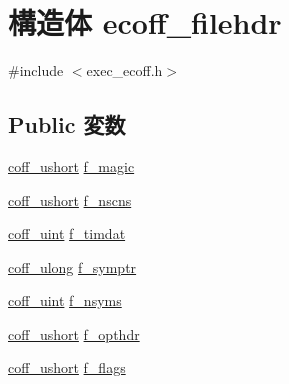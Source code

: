 \hypertarget{structecoff__filehdr}{
\section{構造体 ecoff\_\-filehdr}
\label{structecoff__filehdr}
}


{\ttfamily \#include $<$exec\_\-ecoff.h$>$}\subsection*{Public 変数}
\begin{DoxyCompactItemize}
\item 
\hyperlink{ecoff__machdep_8h_a650e29ece54d87a3fb9db4505a0efb68}{coff\_\-ushort} \hyperlink{structecoff__filehdr_a1be82655fe99764c18d82ed35059ddd4}{f\_\-magic}
\item 
\hyperlink{ecoff__machdep_8h_a650e29ece54d87a3fb9db4505a0efb68}{coff\_\-ushort} \hyperlink{structecoff__filehdr_a952cb2706ba1e3dcc5091df49b3d23f4}{f\_\-nscns}
\item 
\hyperlink{ecoff__machdep_8h_ab38b7c66cf20051c3d7bb0f268d1e2a5}{coff\_\-uint} \hyperlink{structecoff__filehdr_a1ec9f8bf7c9a35813703ff2cdd9a6b9a}{f\_\-timdat}
\item 
\hyperlink{ecoff__machdep_8h_a8465ac1e3c6711a52d3103550d8122fc}{coff\_\-ulong} \hyperlink{structecoff__filehdr_ac2de3677fe0525a3569984e5d035cd74}{f\_\-symptr}
\item 
\hyperlink{ecoff__machdep_8h_ab38b7c66cf20051c3d7bb0f268d1e2a5}{coff\_\-uint} \hyperlink{structecoff__filehdr_a5b036e33452f39c27727d59ed3235e7a}{f\_\-nsyms}
\item 
\hyperlink{ecoff__machdep_8h_a650e29ece54d87a3fb9db4505a0efb68}{coff\_\-ushort} \hyperlink{structecoff__filehdr_ad9d55b306f22e5bc247efc29c6c4db6d}{f\_\-opthdr}
\item 
\hyperlink{ecoff__machdep_8h_a650e29ece54d87a3fb9db4505a0efb68}{coff\_\-ushort} \hyperlink{structecoff__filehdr_ac407b68d9b98027c8c3521b7faa51d99}{f\_\-flags}
\end{DoxyCompactItemize}


